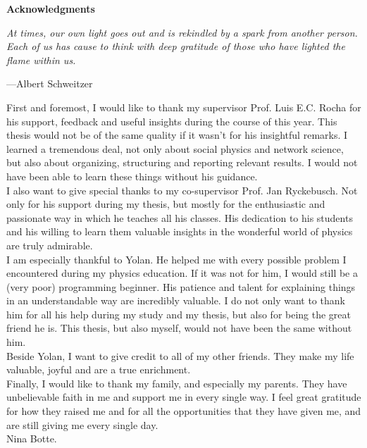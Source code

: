 \documentclass[11 pt , letterpaper , twoside , openright]{book}
\newenvironment{abstract}%
{\cleardoublepage\null \vfill\begin{center}\bfseries \abstractname \end{center}}{\vfill\null}
\begin{document}
\pagestyle{plain}

\setcounter{abstractpage}{\value{page}}

\renewcommand{\abstractname}{Acknowledgments}
\begin{abstract}
\thispagestyle{plain}
\setcounter{page}{\value{abstractpage}}

\epigraph{\itshape At times, our own light goes out and is rekindled by a spark from another person. Each of us has cause to think with deep gratitude of those who have lighted the flame within us.}{---Albert Schweitzer}
\vspace*{\fill}
\noindent
First and foremost, I would like to thank my supervisor Prof. Luis E.C. Rocha for his support, feedback and useful insights during the course of this year. This thesis would not be of the same quality if it wasn't for his insightful remarks. I learned a tremendous deal, not only about social physics and network science, but also about organizing, structuring and reporting relevant results. I would not have been able to learn these things without his guidance.\\
\newline
I also want to give special thanks to my co-supervisor Prof. Jan Ryckebusch. Not only for his support during my thesis, but mostly for the enthusiastic and passionate way in which he teaches all his classes. His dedication to his students and his willing to learn them valuable insights in the wonderful world of physics are truly admirable.\\
\newline
I am especially thankful to Yolan. He helped me with every possible problem I encountered during my physics education. If it was not for him, I would still be a (very poor) programming beginner. His patience and talent for explaining things in an understandable way are incredibly valuable. I do not only want to thank him for all his help during my study and my thesis, but also for being the great friend he is. This thesis, but also myself, would not have been the same without him.\\
\newline
Beside Yolan, I want to give credit to all of my other friends. They make my life valuable, joyful and are a true enrichment.\\
\newline
Finally, I would like to thank my family, and especially my parents. They have unbelievable faith in me and support me in every single way. I feel great gratitude for how they raised me and for all the opportunities that they have given me, and are still giving me every single day.\\
\vfill
\noindent
Nina Botte.

\setcounter{abstractpage}{\value{page}}

\end{abstract}
\setcounter{page}{\value{abstractpage}}
\end{document}

